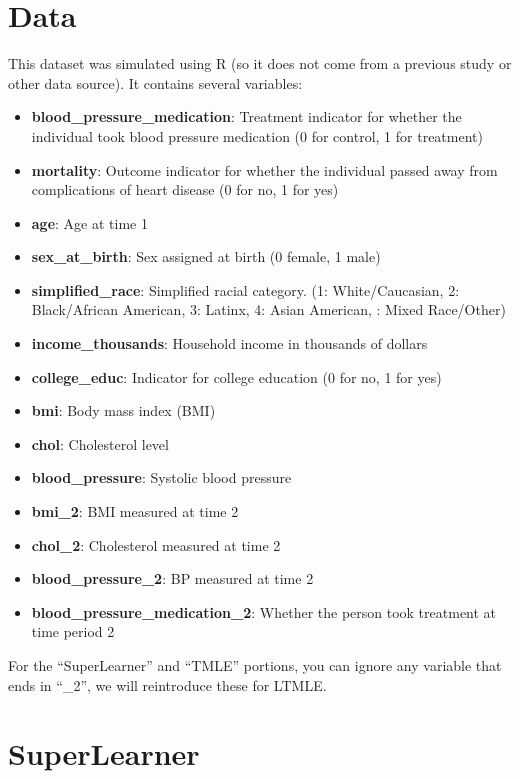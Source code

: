 \documentclass[
]{article}
\begin{document}
\hypertarget{data}{%
\section{Data}\label{data}}

This dataset was simulated using R (so it does not come from a previous
study or other data source). It contains several variables:

\begin{itemize}
    \item \textbf{blood\_pressure\_medication}: Treatment indicator for whether the individual took blood pressure medication (0 for control, 1 for treatment)
    \item \textbf{mortality}: Outcome indicator for whether the individual passed away from complications of heart disease (0 for no, 1 for yes)
    \item \textbf{age}: Age at time 1
    \item \textbf{sex\_at\_birth}: Sex assigned at birth (0 female, 1 male)
    \item \textbf{simplified\_race}: Simplified racial category. (1: White/Caucasian, 2: Black/African American, 3: Latinx, 4: Asian American, : Mixed Race/Other)
    \item \textbf{income\_thousands}: Household income in thousands of dollars
    \item \textbf{college\_educ}: Indicator for college education (0 for no, 1 for yes)
    \item \textbf{bmi}: Body mass index (BMI)
    \item \textbf{chol}: Cholesterol level
    \item \textbf{blood\_pressure}: Systolic blood pressure 
    \item \textbf{bmi\_2}: BMI measured at time 2
    \item \textbf{chol\_2}: Cholesterol measured at time 2
    \item \textbf{blood\_pressure\_2}: BP measured at time 2
    \item \textbf{blood\_pressure\_medication\_2}: Whether the person took treatment at time period 2 
\end{itemize}

For the ``SuperLearner'' and ``TMLE'' portions, you can ignore any
variable that ends in ``\_2'', we will reintroduce these for LTMLE.

\hypertarget{superlearner}{%
\section{SuperLearner}\label{superlearner}}
\end{document}
